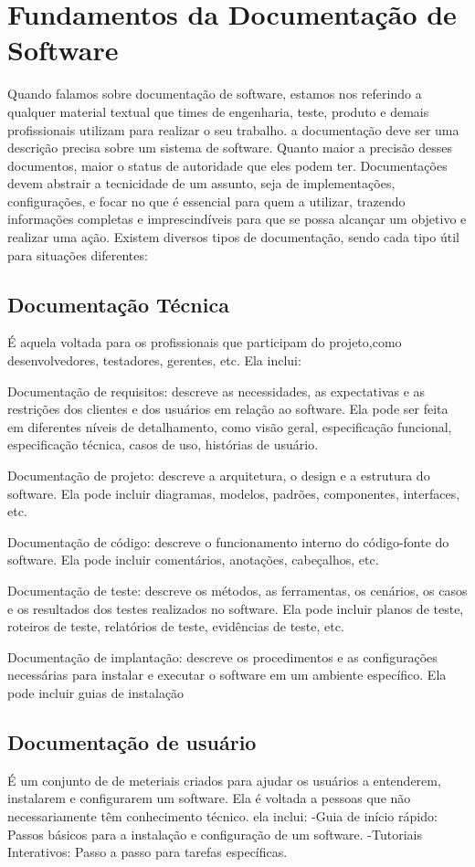 \documentclass[12pt,oneside,a4paper,article]{abntex2}
\begin{document}
\section{Fundamentos da Documentação de Software}
Quando falamos sobre documentação de software, estamos nos referindo a qualquer material textual
que times de engenharia, teste, produto
e demais profissionais utilizam para realizar o seu trabalho. a documentação deve ser uma descrição
precisa sobre um sistema de software.
Quanto maior a precisão desses documentos, maior o status de autoridade que eles podem ter.
Documentações devem abstrair a tecnicidade de um assunto, seja de implementações,
configurações, e focar no que é essencial para quem a utilizar, trazendo informações completas e
imprescindíveis para que se possa alcançar um objetivo e realizar uma ação.
Existem diversos tipos de documentação, sendo cada tipo útil para situações diferentes:


\subsection{Documentação Técnica}
É aquela voltada para os profissionais que participam do projeto,como desenvolvedores, testadores, gerentes, etc. Ela inclui:

Documentação de requisitos: descreve as necessidades, as expectativas e as restrições dos clientes e dos usuários em relação ao software. Ela pode ser feita em diferentes níveis de detalhamento,
como visão geral, especificação funcional, especificação técnica, casos de uso, histórias de usuário.


Documentação de projeto: descreve a arquitetura, o design e a estrutura do software. Ela pode
incluir diagramas, modelos, padrões, componentes, interfaces, etc.


Documentação de código: descreve o funcionamento interno do código-fonte do software. Ela
pode incluir comentários, anotações, cabeçalhos, etc.


Documentação de teste: descreve os métodos, as ferramentas, os cenários, os casos e os resultados
dos testes realizados no software. Ela pode incluir planos de teste, roteiros de teste, relatórios de
teste, evidências de teste, etc.


Documentação de implantação: descreve os procedimentos e as configurações necessárias para
instalar e executar o software em um ambiente específico. Ela pode incluir guias de instalação


\subsection{Documentação de usuário}
É um conjunto de de meteriais criados para ajudar os
usuários a entenderem, instalarem e configurarem um software. Ela é voltada a pessoas
que não necessariamente têm conhecimento técnico. ela inclui:
-Guia de início rápido: Passos básicos para a instalação e configuração de um software.
-Tutoriais Interativos: Passo a passo para tarefas específicas.
\end{document}
